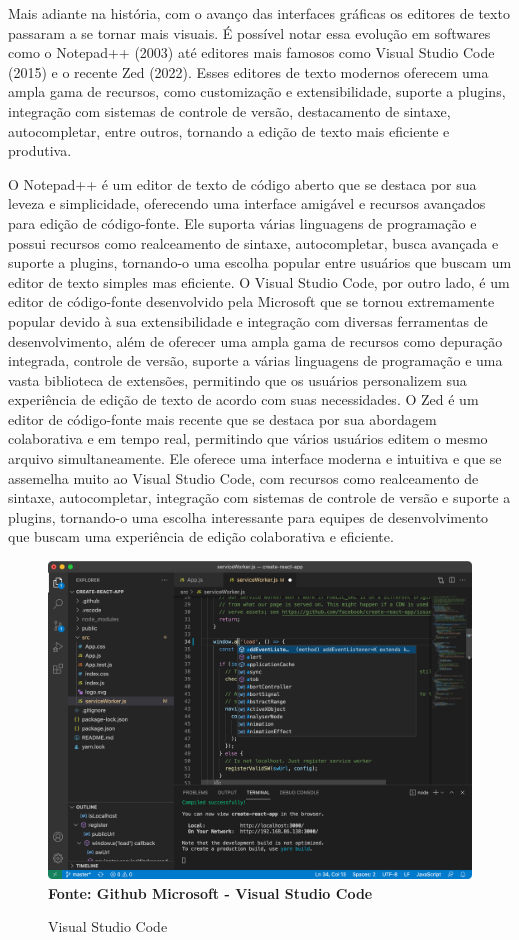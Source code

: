 Mais adiante na história, com o avanço das interfaces gráficas os editores de texto passaram a se tornar mais visuais. É possível notar essa evolução em
softwares como o Notepad++ (2003) até editores mais famosos como Visual Studio Code (2015) e o recente Zed (2022). Esses editores de texto modernos oferecem
uma ampla gama de recursos, como customização e extensibilidade, suporte a plugins, integração com sistemas de controle de versão, destacamento de sintaxe,
autocompletar, entre outros, tornando a edição de texto mais eficiente e produtiva.

O Notepad++ é um editor de texto de código aberto que se destaca por sua leveza e simplicidade, oferecendo uma interface amigável e recursos avançados
para edição de código-fonte. Ele suporta várias linguagens de programação e possui recursos como realceamento de sintaxe, autocompletar, busca avançada e
suporte a plugins, tornando-o uma escolha popular entre usuários que buscam um editor de texto simples mas eficiente. O Visual Studio Code,
por outro lado, é um editor de código-fonte desenvolvido pela Microsoft que se tornou extremamente popular devido à sua extensibilidade e integração com
diversas ferramentas de desenvolvimento, além de oferecer uma ampla gama de recursos como depuração integrada, controle de versão, suporte a várias linguagens
de programação e uma vasta biblioteca de extensões, permitindo que os usuários personalizem sua experiência de edição de texto de acordo com suas necessidades.
O Zed é um editor de código-fonte mais recente que se destaca por sua abordagem colaborativa e em tempo real, permitindo que vários usuários editem o mesmo
arquivo simultaneamente. Ele oferece uma interface moderna e intuitiva e que se assemelha muito ao Visual Studio Code, com recursos como realceamento de sintaxe,
autocompletar, integração com sistemas de controle de versão e suporte a plugins, tornando-o uma escolha interessante para equipes de desenvolvimento que buscam
uma experiência de edição colaborativa e eficiente.

\FloatBarrier
\begin{figure}[!htbp]
	\centering
	\caption{Visual Studio Code}
	\includegraphics[scale=0.3]{imagens/VSCode}
	\\\textbf{Fonte: Github Microsoft - Visual Studio Code}
	\label{fig:VSCode}
\end{figure}
\FloatBarrier

